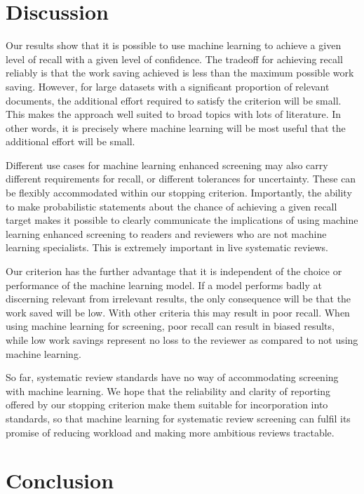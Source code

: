 \documentclass{bmcart}
\begin{document}
	\section*{Discussion}
	
	Our results show that it is possible to use machine learning to achieve a given level of recall with a given level of confidence. The tradeoff for achieving recall reliably is that the work saving achieved is less than the maximum possible work saving. However, for large datasets with a significant proportion of relevant documents, the additional effort required to satisfy the criterion will be small. This makes the approach well suited to broad topics with lots of literature. In other words, it is precisely where machine learning will be most useful that the additional effort will be small.
	
	Different use cases for machine learning enhanced screening may also carry different requirements for recall, or different tolerances for uncertainty. These can be flexibly accommodated within our stopping criterion. Importantly, the ability to make probabilistic statements about the chance of achieving a given recall target makes it possible to clearly communicate the implications of using machine learning enhanced screening to readers and reviewers who are not machine learning specialists. This is extremely important in live systematic reviews. 
	
	Our criterion has the further advantage that it is independent of the choice or performance of the machine learning model. If a model performs badly at discerning relevant from irrelevant results, the only consequence will be that the work saved will be low. With other criteria this may result in poor recall. 
	When using machine learning for screening, poor recall can result in biased results, while low work savings represent no loss to the reviewer as compared to not using machine learning.
	
	So far, systematic review standards have no way of accommodating screening with machine learning. 
	We hope that the reliability and clarity of reporting offered by our stopping criterion make them suitable for incorporation into standards, so that machine learning for systematic review screening can fulfil its promise of reducing workload and making more ambitious reviews tractable.
	
	\section*{Conclusion}
	
\end{document}
